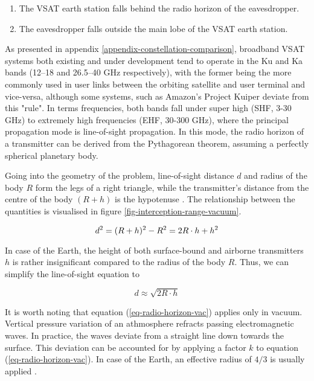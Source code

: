 \documentclass[english, 12pt, a4paper, elec, utf8, a-1b, online]{aaltothesis}
\begin{document}
\begin{enumerate}
  \item The VSAT earth station falls behind the radio horizon of the eavesdropper.
  \item The eavesdropper falls outside the main lobe of the VSAT earth station.
\end{enumerate}

As presented in appendix \ref{appendix-constellation-comparison}, broadband VSAT systems both existing and under development tend to operate in the Ku and Ka bands (12--18 and 26.5--40 GHz respectively), with the former being the more commonly used in user links between the orbiting satellite and user terminal and vice-versa, although some systems, such as Amazon's Project Kuiper deviate from this "rule". %
In terms frequencies, both bands fall under super high (SHF, 3-30 GHz) to extremely high frequencies (EHF, 30-300 GHz), where the principal propagation mode is line-of-sight propagation.
In this mode, the radio horizon of a transmitter can be derived from the Pythagorean theorem, assuming a perfectly spherical planetary body.

Going into the geometry of the problem, line-of-sight distance $d$ and radius of the body $R$ form the legs of a right triangle, while the transmitter's distance from the centre of the body $(R+h)$ is the hypotenuse \cite{seybold2005introduction}.
The relationship between the quantities is visualised in figure \ref{fig-interception-range-vacuum}.


\begin{equation*}
  d^2=(R+h)^{2}-R^2= 2R \cdot h + h^2 \\
\end{equation*}

In case of the Earth, the height of both surface-bound and airborne transmitters $h$ is rather insignificant compared to the radius of the body $R$. Thus, we can simplify the line-of-sight equation to

\begin{equation} \label{eq-radio-horizon-vac}
  d \approx \sqrt{2R \cdot h}
\end{equation}

It is worth noting that equation (\ref{eq-radio-horizon-vac}) applies only in vacuum.
Vertical pressure variation of an athmosphere refracts passing electromagnetic waves. In practice, the waves deviate from a straight line down towards the surface. This deviation can be accounted for by applying a factor $k$ to equation (\ref{eq-radio-horizon-vac}). In case of the Earth, an effective radius of $4/3$ is usually applied \cite{seybold2005introduction}.
\end{document}
